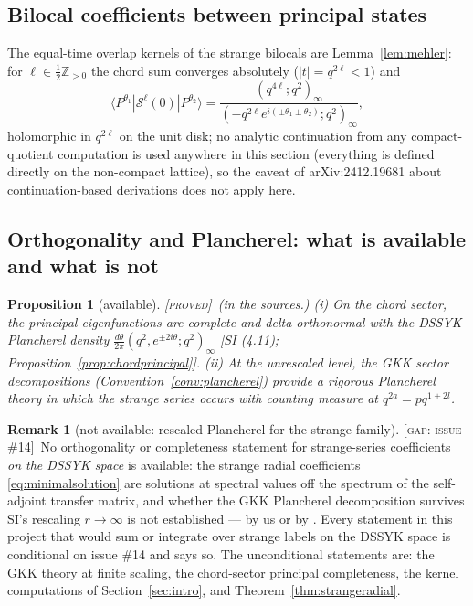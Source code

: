 \documentclass[11pt,a4paper]{article}
\newcommand{\PROVED}{{\color{ForestGreen}\textsc{[proved]}}}
\newcommand{\GAP}[1]{{\color{red}\textsc{[gap: issue \##1]}}}
\theoremstyle{definition}
\newtheorem{remark}[definition]{Remark}
\theoremstyle{plain}
\newtheorem{proposition}[definition]{Proposition}
\newcommand{\Z}{\mathbb{Z}}
\newcommand{\ket}[1]{|#1\rangle}
\newcommand{\bra}[1]{\langle #1|}
\renewcommand{\P}{P}                            %
\begin{document}
\subsection{Bilocal coefficients between principal states}

The equal-time overlap kernels of the strange bilocals are Lemma~\ref{lem:mehler}: for
$\ell\in\tfrac12\Z_{>0}$ the chord sum converges absolutely ($|t|=q^{2\ell}<1$) and
\begin{equation}
  \bra{\P^{\theta_1}}\mathcal{S}^{\ell}(0)\ket{\P^{\theta_2}}
  =\frac{(q^{4\ell};q^{2})_{\infty}}{(-q^{2\ell}e^{i(\pm\theta_1\pm\theta_2)};q^{2})_{\infty}},
\end{equation}
holomorphic in $q^{2\ell}$ on the unit disk; no analytic continuation from any compact-quotient
computation is used anywhere in this section (everything is defined directly on the non-compact
lattice), so the caveat of arXiv:2412.19681 about continuation-based derivations does not apply
here.

\subsection{Orthogonality and Plancherel: what is available and what is not}

\begin{proposition}[available]\label{prop:planchereldata}
\PROVED\ (in the sources.) (i) On the chord sector, the principal eigenfunctions are complete
and delta-orthonormal with the DSSYK Plancherel density
$\frac{d\theta}{2\pi}(q^{2},e^{\pm2i\theta};q^{2})_{\infty}$ [SI (4.11);
Proposition~\ref{prop:chordprincipal}]. (ii) At the unrescaled level, the GKK sector
decompositions (Convention~\ref{conv:plancherel}) provide a rigorous Plancherel theory in which
the strange series occurs with counting measure at $q^{2a}=pq^{1+2l}$.
\end{proposition}

\begin{remark}[not available: rescaled Plancherel for the strange family]\label{rem:noplancherel}
\GAP{14}\ No orthogonality or completeness statement for strange-series coefficients
\emph{on the DSSYK space} is available: the strange radial coefficients
\eqref{eq:minimalsolution} are solutions at spectral values off the spectrum of the self-adjoint
transfer matrix, and whether the GKK Plancherel decomposition survives SI's rescaling
$r\to\infty$ is not established --- by us or by \cite{Schouten:2025dssyk}. Every statement in
this project that would sum or integrate over strange labels on the DSSYK space is conditional
on issue \#14 and says so. The unconditional statements are: the GKK theory at finite scaling,
the chord-sector principal completeness, the kernel computations of Section~\ref{sec:intro},
and Theorem~\ref{thm:strangeradial}.
\end{remark}
\end{document}
